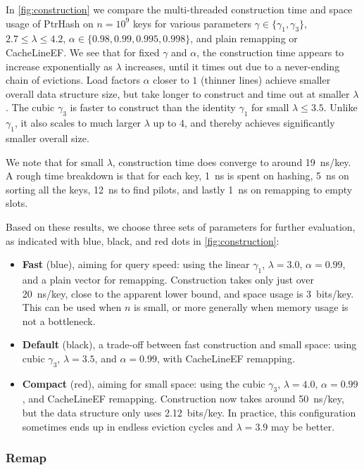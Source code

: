 \documentclass[a4paper,UKenglish,cleveref,thm-restate]{lipics-v2021}
\begin{document}
In \cref{fig:construction} we compare the multi-threaded construction time and space usage of PtrHash on
\(n=10^9\) keys for
various parameters \(\gamma\in \{\gamma_1, \gamma_3\}\), \(2.7\leq \lambda\leq 4.2\),
\(\alpha\in \{0.98, 0.99, 0.995, 0.998\}\), and plain remapping or CacheLineEF.
We see that for fixed \(\gamma\) and \(\alpha\), the construction time appears to
increase exponentially as \(\lambda\) increases, until it times out due to a
never-ending chain of evictions.
Load factors \(\alpha\) closer to \(1\) (thinner lines) achieve smaller overall data
structure size, but take longer to construct and time out at smaller \(\lambda\).
The cubic \(\gamma_3\) is faster to construct than the identity \(\gamma_1\) for
small \(\lambda \leq 3.5\). Unlike \(\gamma_1\), it also scales to much larger
\(\lambda\) up to \(4\), and thereby achieves significantly smaller overall size.

We note that for small \(\lambda\), construction time does converge to around 19~ns/key.
A rough time breakdown is that for each key, 1~ns is spent on hashing, 5~ns
on sorting all the keys, 12~ns to find pilots, and lastly 1~ns on remapping
to empty slots.

Based on these results, we choose three sets of parameters for further
evaluation, as indicated with blue, black, and red dots in \cref{fig:construction}:
\begin{itemize}
\item \textbf{Fast} (blue), aiming for query speed: using the linear \(\gamma_1\), \(\lambda=3.0\), \(\alpha=0.99\), and a plain
vector for remapping.
Construction takes only just over 20~ns/key, close to the apparent lower
bound, and space usage is 3~bits/key. This can be used when \(n\) is small, or
more generally when memory usage is not a bottleneck.
\item \textbf{Default} (black), a trade-off between fast construction and small
space: using cubic \(\gamma_3\), \(\lambda=3.5\), and \(\alpha=0.99\), with
CacheLineEF remapping.
\item \textbf{Compact} (red), aiming for small space: using the cubic \(\gamma_3\), \(\lambda=4.0\), \(\alpha=0.99\), and
CacheLineEF remapping. Construction now takes around 50~ns/key, but the data
structure only uses 2.12~bits/key.
In practice, this configuration sometimes ends up in endless eviction cycles
and \(\lambda=3.9\) may be better.
\end{itemize}
\subsubsection{Remap}
\label{sec:org2831d24}
\end{document}
